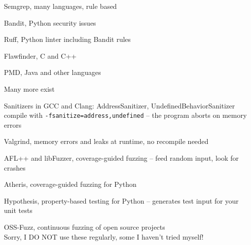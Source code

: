 \documentclass[Screen16to9,17pt]{foils}
\begin{document}
\begin{list2}
\item Semgrep, many languages, rule based 
\item Bandit, Python security issues 
\item Ruff, Python linter including Bandit rules 
\item Flawfinder, C and C++ 
\item PMD, Java and other languages 
\end{list2}

Many more exist 


\begin{list2}
\item Sanitizers in GCC and Clang: AddressSanitizer, UndefinedBehaviorSanitizer\\
compile with \verb+-fsanitize=address,undefined+ -- the program aborts on memory errors\\
{\footnotesize{}}
\item Valgrind, memory errors and leaks at runtime, no recompile needed\\
{\footnotesize{}}
\item AFL++ and libFuzzer, coverage-guided fuzzing -- feed random input, look for crashes\\
{\footnotesize{}} {\footnotesize{}}
\item Atheris, coverage-guided fuzzing for Python\\
{\footnotesize{}}
\item Hypothesis, property-based testing for Python -- generates test input for your unit tests\\
{\footnotesize{}}
\item OSS-Fuzz, continuous fuzzing of open source projects\\
{\footnotesize{}}
\hfill Sorry, I DO NOT use these regularly, some I haven't tried myself!
\end{list2}


\end{document}
